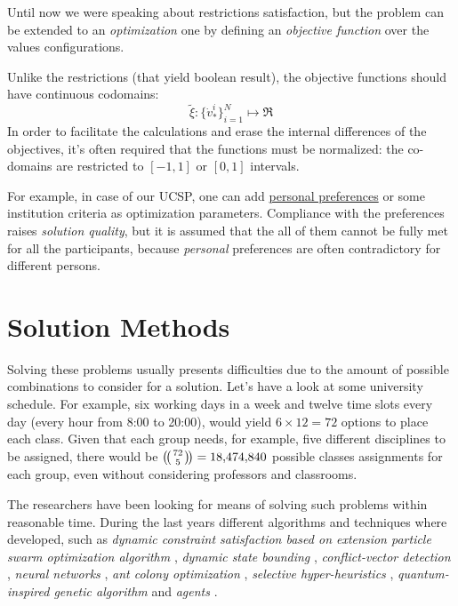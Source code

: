 \documentclass[ThesisDoc]{subfiles}
\begin{document}
\bigskip

  Until now we were speaking about restrictions satisfaction, but the problem can
be extended to an \emph{optimization} one by defining an
\emph{objective function} over the values configurations.

  Unlike the restrictions (that yield boolean result), the objective functions
should have continuous codomains:
$$\tilde\xi : \{{\dot v}^i_\ast\}_{i=1}^N \mapsto \Re$$
  In order to facilitate the calculations and erase the internal differences of
the objectives, it's often required that the functions must be normalized:
the co-domains are restricted to $[-1,1]$ or $[0,1]$ intervals.

  For example, in case of our UCSP,
one can add \underline{personal preferences} or some institution criteria as
optimization parameters.
  Compliance with the preferences raises \emph{solution quality},
but it is assumed that the all of them cannot be fully met for all the
participants, because \emph{personal} preferences are often
contradictory for different persons.

\section{Solution Methods}

  Solving these problems usually presents difficulties due to the amount of
possible combinations to consider for a solution. Let's have a look at
some university schedule.
  For example, six working days in a week and twelve time slots every day
(every hour from 8:00 to 20:00), would yield $6 \times 12 = 72$ options
to place each class.
  Given that each group needs, for example, five different disciplines to be assigned,
there would be $\multibinom{72}{5} = \num[group-separator={,}]{18474840}$
possible classes assignments for each group,
even without considering professors and classrooms.

\medskip
\noindent

  The researchers have been looking for means of solving such
problems within reasonable time.
  During the last years different algorithms and techniques where developed,
such as
\emph{dynamic constraint satisfaction based on extension particle swarm
      optimization algorithm} \cite{CSPswarm},
\emph{dynamic state bounding} \cite{CSPdynStateBound},
\emph{conflict-vector detection} \cite{CSPtimetable},
\emph{neural networks} \cite{CSPneuro},
\emph{ant colony optimization} \cite{CSPcunningACO, CSPlimmemACO},
\emph{selective hyper-heuristics} \cite{CSPhypHeur},
\emph{quantum-inspired genetic algorithm} \cite{QuantumGeneticAlgorithm}
and \emph{agents} \cite{CSPagent2013, CSPagent2014, DCSPagent1998}.
\end{document}
